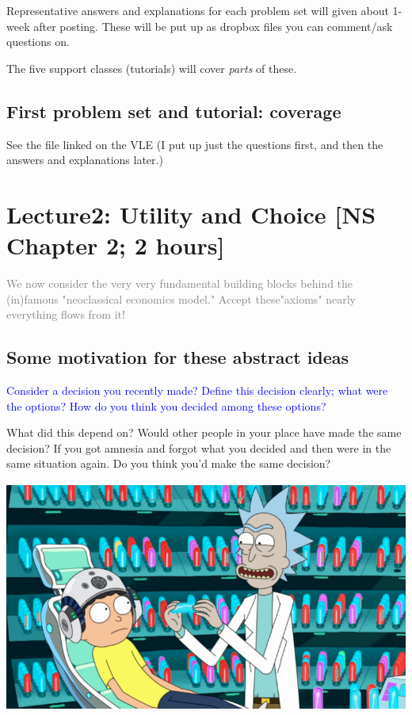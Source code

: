 \documentclass[]{article}
\begin{document}
Representative answers and explanations for each problem set will given about 1-week after posting. These will be put up as dropbox files you can comment/ask questions on.

The five support classes (tutorials) will cover \emph{parts} of these.

\hypertarget{first-problem-set-and-tutorial-coverage}{%
\subsection{First problem set and tutorial: coverage}\label{first-problem-set-and-tutorial-coverage}}

See the file linked on the VLE (I put up just the questions first, and then the answers and explanations later.)

\hypertarget{lecture2-utility-and-choice-ns-chapter-2-2-hours}{%
\section{Lecture2: Utility and Choice {[}NS Chapter 2; 2 hours{]}}\label{lecture2-utility-and-choice-ns-chapter-2-2-hours}}

\textcolor{grey}{We now consider the very very fundamental building blocks behind the (in)famous "neoclassical economics model." Accept these"axioms" nearly everything flows from it!}

\hypertarget{some-motivation-for-these-abstract-ideas}{%
\subsection{Some motivation for these abstract ideas}\label{some-motivation-for-these-abstract-ideas}}

\textcolor{blue}{Consider a decision you recently made?  Define this decision clearly; what were the options?  How do you think you decided among these options?}

What did this depend on? Would other people in your place have made the same decision?
If you got amnesia and forgot what you decided and then were in the same situation again. Do you think you'd make the same decision?

\includegraphics[height=3in]{picsfigs/mortys-mind-blower.png}
\end{document}
